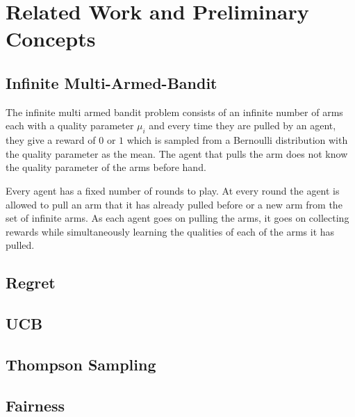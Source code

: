 \section{Related Work and Preliminary Concepts}

\subsection{Infinite Multi-Armed-Bandit}

The infinite multi armed bandit problem consists of an infinite number of arms each with a quality parameter $\mu_i$ and every time they are pulled by an agent, they give a reward of $0$ or $1$ which is sampled from a Bernoulli distribution with the quality parameter as the mean. The agent that pulls the arm does not know the quality parameter of the arms before hand.

Every agent has a fixed number of rounds to play. At every round the agent is allowed to pull an arm that it has already pulled before or a new arm from the set of infinite arms. As each agent goes on pulling the arms, it goes on collecting rewards while simultaneously learning the qualities of each of the arms it has pulled.

\subsection{Regret}

\begin{definition}
\end{definition}

\subsection{UCB}
\subsection{Thompson Sampling}

\subsection{Fairness}